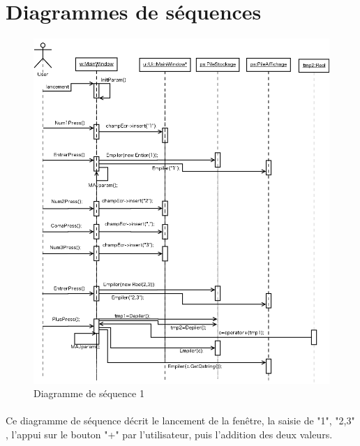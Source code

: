 \documentclass[a4paper,11pt]{report}
\begin{document}
	\section{Diagrammes de séquences}
		\begin{figure}[H]
			\center
			\includegraphics[width=16cm]{diag_seq_1.png}
			\caption{Diagramme de séquence 1}
			\label{Diagramme sequence 1}
		\end{figure}
		
		\paragraph{}Ce diagramme de séquence décrit le lancement de la fenêtre, la saisie de "1", "2,3" , l'appui sur le bouton "+" par l'utilisateur, puis l'addition des deux valeurs.
\end{document}
